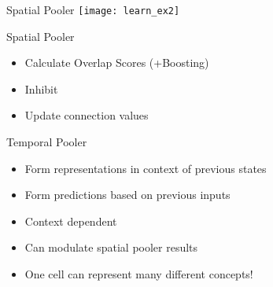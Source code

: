 \begin{frame}[c]{Spatial Pooler}
    \texttt{[image: learn\_ex2]}
\end{frame}

\begin{frame}[c]{Spatial Pooler}
    \Large
    \begin{itemize}[<+(1)->]
        \item Calculate Overlap Scores (+Boosting)
        \item Inhibit
        \item Update connection values
    \end{itemize}
\end{frame}


\begin{frame}[c]{Temporal Pooler}
    \Large
    \begin{itemize}[<+(1)->]
        \item Form representations in context of previous states
        \item Form predictions based on previous inputs
        \item Context dependent
        \item Can modulate spatial pooler results
        \item One cell can represent many different concepts!
    \end{itemize}
\end{frame}





